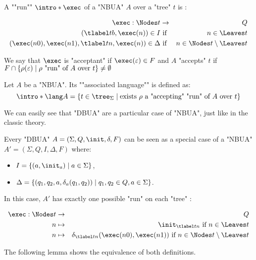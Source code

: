 \documentclass[a4paper,UKenglish,cleveref, autoref, thm-restate]{lipics-v2021}
\begin{document}
\begin{definition}
	\AP A ""run"" $\intro* \exec$ of a "NBUA" $A$ over a "tree" $t$ is :

	\begin{eqnarray*}
		\exec : \Nodes t &\to& Q \\
		(\tlabel t b,  \exec (n) ) \in I &\text{ if }& n \in \Leaves t \\
		(\exec (n0), \exec (n1), \tlabel t n, \exec (n)) \in \Delta &\text{ if }& n \in \Nodes t \setminus \Leaves t
	\end{eqnarray*}

	We say that $\exec$ is "acceptant" if $\exec (\varepsilon) \in F$ and $A$ "accepts" $t$ if
	$F \cap \left\{\rho(\varepsilon) \mid \text{$\rho$ "run" of~$A$ over~$t$}\right\} \neq \emptyset$
\end{definition}


\begin{definition}
	\AP Let $A$ be a "NBUA". Its ""associated language"" is defined as:
	\[\intro* \lang A = \setdef {t \in \tree_{\Sigma}} {\text{exists $\rho$ a "accepting" "run" of $A$ over $t$}} \]
\end{definition}

We can easily see that "DBUA" are a particular case of "NBUA", just like in the classic theory.

\begin{remark}
	Every "DBUA" $A = (\Sigma, Q, \init, \delta, F)$ can be seen as a special case of a "NBUA"
	$A' = (\Sigma, Q, I, \Delta, F)$ where:
	\begin{itemize}
		\item $I = \setdef{(a, \init_a)}{a \in \Sigma}$,
		\item $\Delta = \left\{(q_1, q_2, a, \delta_a(q_1, q_2)) \mid q_1, q_2 \in Q, a \in \Sigma\right\}$.
	\end{itemize}

	In this case, $A'$ has exactly one possible "run" on each "tree" :

	\begin{eqnarray*}
		\exec : \Nodes t &\to & Q \\
		n  &\mapsto& \init_{\tlabel t n} \text{ if } n \in \Leaves t \\
		n  &\mapsto& \delta_{\tlabel t n}(\exec (n0), \exec (n1)) \text{ if } n \in \Nodes t \setminus \Leaves t
	\end{eqnarray*}
\end{remark}


The following lemma shows the equivalence of both definitions.
\end{document}
